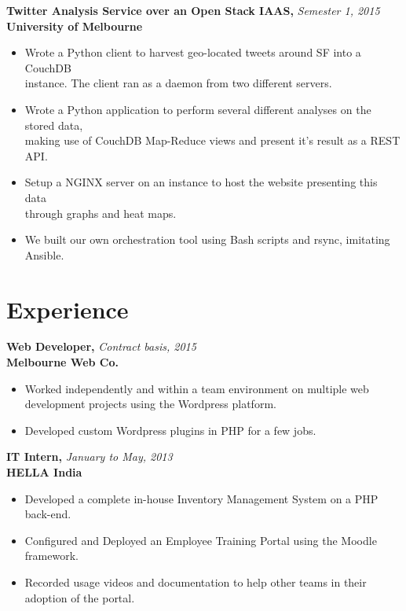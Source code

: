 \documentclass[a4paper,overlapped]{res}
\begin{document}
\begin{resume}
  \textbf{Twitter Analysis Service over an Open Stack IAAS,} 
  \hfill \textit{Semester 1, 2015}\\
  \textbf{University of Melbourne}
  \begin{itemize}
  \item Wrote a Python client to harvest geo-located tweets around SF into a
    CouchDB \\
    instance. The client ran as a daemon from two different servers.
  \item Wrote a Python application to perform several different analyses on the
    stored data, \\
    making use of CouchDB Map-Reduce views and present it's result
    as a REST API.
  \item Setup a NGINX server on an instance to host the website presenting this
    data \\ through graphs and heat maps.
  \item We built our own orchestration tool using Bash scripts and rsync,
    imitating Ansible.
    
  \end{itemize}
  

  \section{Experience}

  \textbf{Web Developer,} \hfill \textit{Contract basis, 2015}\\
  \textbf{Melbourne Web Co.}
  \begin{itemize}
  \item Worked independently and within a team environment on multiple web 
    development projects using the Wordpress platform.
  \item Developed custom Wordpress plugins in PHP for a few jobs.  
  \end{itemize}

  \textbf{IT Intern,} \hfill \textit{January to May, 2013}\\
  \textbf{HELLA India}
  \begin{itemize}
  \item Developed a complete in-house Inventory Management System on a PHP
    back-end. 
  \item Configured and Deployed an Employee Training Portal using the
    Moodle framework.
  \item Recorded usage videos and documentation to help other teams in their
    adoption of the portal.
  \end{itemize}
  

\end{resume}
\end{document}
